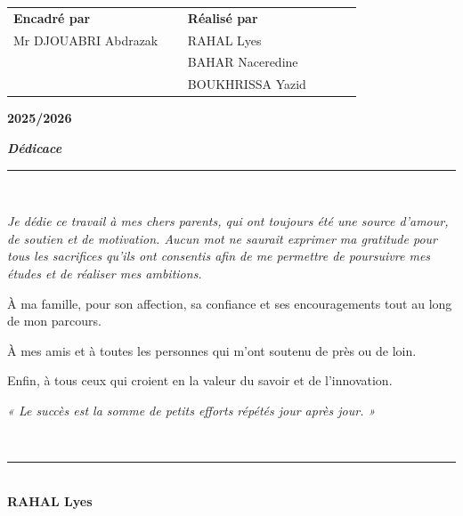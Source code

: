 \documentclass[12pt,a4paper]{report}
\begin{document}
\begin{titlepage}
  \begin{tabular}{p{0.45\linewidth} p{0.45\linewidth}}
    \textbf{Encadré par}       & \textbf{Réalisé par}   \\[6pt]
    \quad Mr DJOUABRI Abdrazak & \quad RAHAL Lyes       \\
                               & \quad BAHAR Naceredine \\
                               & \quad BOUKHRISSA Yazid \\
  \end{tabular}

  \vfill

  \begin{center}
    {\large\bfseries 2025/2026}
  \end{center}

\end{titlepage}

\cleardoublepage
\thispagestyle{empty}
\vspace*{4cm}

\begin{center}
  {\large\textit{\textcolor{primary}{\bfseries Dédicace}}}\\[0.8cm]
  \rule{0.4\linewidth}{0.4pt}\\[1cm]

  {\normalsize\itshape
  Je dédie ce travail à mes chers parents, qui ont toujours été une source
  d'amour, de soutien et de motivation. Aucun mot ne saurait exprimer ma
  gratitude pour tous les sacrifices qu'ils ont consentis afin de me permettre
  de poursuivre mes études et de réaliser mes ambitions.

  À ma famille, pour son affection, sa confiance et ses encouragements tout au
  long de mon parcours.

  À mes amis et à toutes les personnes qui m'ont soutenu de près ou de loin.

  Enfin, à tous ceux qui croient en la valeur du savoir et de l'innovation.

  \vspace{1cm}
  \textit{« Le succès est la somme de petits efforts répétés jour après jour. »}

  }\\[1cm]

  \rule{0.4\linewidth}{0.4pt}\\[0.5cm]
  {\bfseries RAHAL Lyes}
\end{center}

\newpage
\end{document}
